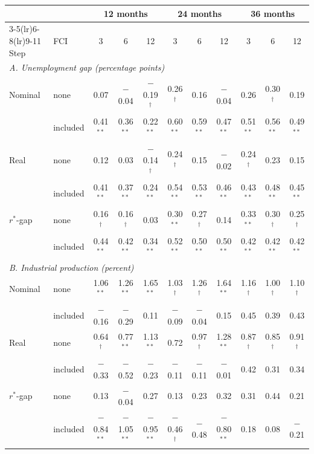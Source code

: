 \begin{tabular}{llccccccccc}
\toprule
 & & \multicolumn{3}{c}{12 months} & \multicolumn{3}{c}{24 months} & \multicolumn{3}{c}{36 months}\\
\cmidrule(lr){3-5}\cmidrule(lr){6-8}\cmidrule(lr){9-11}
Step & FCI & 3 & 6 & 12 & 3 & 6 & 12 & 3 & 6 & 12 \\
\midrule
\multicolumn{11}{l}{\textit{A. Unemployment gap (percentage points)}}\\
Nominal & none & 0.07 & $-$0.04 & $-$0.19$^{\dagger}$ & 0.26$^{\dagger}$ & 0.16 & $-$0.04 & 0.26 & 0.30$^{\dagger}$ & 0.19 \\
 & included & 0.41$^{**}$ & 0.36$^{**}$ & 0.22$^{**}$ & 0.60$^{**}$ & 0.59$^{**}$ & 0.47$^{**}$ & 0.51$^{**}$ & 0.56$^{**}$ & 0.49$^{**}$ \\
Real & none & 0.12 & 0.03 & $-$0.14$^{\dagger}$ & 0.24$^{\dagger}$ & 0.15 & $-$0.02 & 0.24$^{\dagger}$ & 0.23 & 0.15 \\
 & included & 0.41$^{**}$ & 0.37$^{**}$ & 0.24$^{**}$ & 0.54$^{**}$ & 0.53$^{**}$ & 0.46$^{**}$ & 0.43$^{**}$ & 0.48$^{**}$ & 0.45$^{**}$ \\
$r^*$-gap & none & 0.16$^{\dagger}$ & 0.16$^{\dagger}$ & 0.03 & 0.30$^{**}$ & 0.27$^{\dagger}$ & 0.14 & 0.33$^{**}$ & 0.30$^{\dagger}$ & 0.25$^{\dagger}$ \\
 & included & 0.44$^{**}$ & 0.42$^{**}$ & 0.34$^{**}$ & 0.52$^{**}$ & 0.50$^{**}$ & 0.50$^{**}$ & 0.42$^{**}$ & 0.42$^{**}$ & 0.42$^{**}$ \\
\midrule
\multicolumn{11}{l}{\textit{B. Industrial production (percent)}}\\
Nominal & none & 1.06$^{**}$ & 1.26$^{**}$ & 1.65$^{**}$ & 1.03$^{\dagger}$ & 1.26$^{\dagger}$ & 1.64$^{**}$ & 1.16$^{\dagger}$ & 1.00$^{\dagger}$ & 1.10$^{\dagger}$ \\
 & included & $-$0.16 & $-$0.29 & 0.11 & $-$0.09 & $-$0.04 & 0.15 & 0.45 & 0.39 & 0.43 \\
Real & none & 0.64$^{\dagger}$ & 0.77$^{**}$ & 1.13$^{**}$ & 0.72 & 0.97$^{\dagger}$ & 1.28$^{**}$ & 0.87$^{\dagger}$ & 0.85$^{\dagger}$ & 0.91$^{\dagger}$ \\
 & included & $-$0.33 & $-$0.52 & $-$0.23 & $-$0.11 & $-$0.11 & $-$0.01 & 0.42 & 0.31 & 0.34 \\
$r^*$-gap & none & 0.13 & $-$0.04 & 0.27 & 0.13 & 0.23 & 0.32 & 0.31 & 0.44 & 0.21 \\
 & included & $-$0.84$^{**}$ & $-$1.05$^{**}$ & $-$0.95$^{**}$ & $-$0.46$^{\dagger}$ & $-$0.48 & $-$0.80$^{**}$ & 0.18 & 0.08 & $-$0.21 \\
\bottomrule
\end{tabular}
